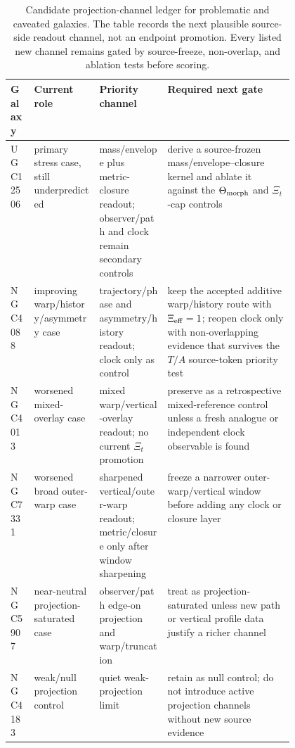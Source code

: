 \documentclass[11pt]{article}
\begin{document}
\begin{table}[H]
\centering
\scriptsize
\setlength{\tabcolsep}{2pt}
\begin{tabularx}{\linewidth}{@{}l p{0.23\linewidth} p{0.24\linewidth} X@{}}
\toprule
Galaxy & Current role & Priority channel & Required next gate \\
\midrule
UGC12506 &
primary stress case, still underpredicted &
mass/envelope plus metric-closure readout; observer/path and clock remain
secondary controls &
derive a source-frozen mass/envelope--closure kernel and ablate it against the
\(\Theta_{\rm morph}\) and \(\Xi_t\)-cap controls \\
NGC4088 &
improving warp/history/asymmetry case &
trajectory/phase and asymmetry/history readout; clock only as control &
keep the accepted additive warp/history route with \(\Xi_{\rm eff}=1\);
reopen clock only with non-overlapping evidence that survives the \(T/A\)
source-token priority test \\
NGC4013 &
worsened mixed-overlay case &
mixed warp/vertical-overlay readout; no current \(\Xi_t\) promotion &
preserve as a retrospective mixed-reference control unless a fresh analogue or
independent clock observable is found \\
NGC7331 &
worsened broad outer-warp case &
sharpened vertical/outer-warp readout; metric/closure only after window
sharpening &
freeze a narrower outer-warp/vertical window before adding any clock or
closure layer \\
NGC5907 &
near-neutral projection-saturated case &
observer/path edge-on projection and warp/truncation &
treat as projection-saturated unless new path or vertical profile data justify
a richer channel \\
NGC4183 &
weak/null projection control &
quiet weak-projection limit &
retain as null control; do not introduce active projection channels without
new source evidence \\
\bottomrule
\end{tabularx}
\caption{Candidate projection-channel ledger for problematic and caveated
galaxies.  The table records the next plausible source-side readout channel,
not an endpoint promotion.  Every listed new channel remains gated by
source-freeze, non-overlap, and ablation tests before scoring.}
\label{tab:problematic-channel-ledger}
\end{table}
\end{document}
